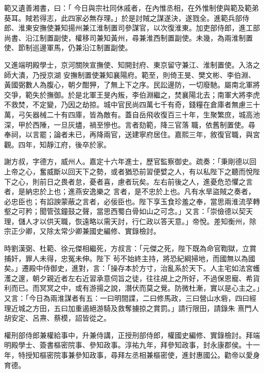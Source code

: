 \begin{pinyinscope}
 範又遺善湘書，曰：「
 今日與宗社同休戚者，在內惟丞相，在外惟制使與範及範弟葵耳。賊若得志，此四家必無存理。」於是討賊之謀遂決，遂戮全。進範兵部侍郎、淮東安撫使兼知揚州兼江淮制置司參謀官，以次復淮東。加吏部侍郎，進工部尚書、沿江制置副使，權移司兼知黃州，尋兼淮西制置副使。未幾，為兩淮制置使、節制巡邊軍馬，仍兼沿江制置副使。



 又進端明殿學士，京河關陜宣撫使、知開封府、東京留守兼江、淮制置使。入洛之師大潰，乃授京湖
 安撫制置使兼知襄陽府。範至，則倚王旻、樊文彬、李伯淵、黃國弼數人為腹心，朝夕酣狎，了無上下之序。民訟邊防，一切廢馳。屬南北軍將交爭，範失於撫御。於是北軍王旻內叛，李伯淵繼之，焚襄陽北去；南軍大將李虎不救焚，不定變，乃因之劫掠。城中官民尚四萬七千有奇，錢糧在倉庫者無慮三十萬，弓矢器械二十有四庫，皆為敵有。蓋自岳飛收復百三十年，生聚繁庶，城高池深，甲於西陲，一旦灰燼，禍至慘也。言者劾範，降三官落
 職，依舊制置使。尋奉祠，以言罷；論者未已，再降兩官，送建寧府居住。嘉熙三年，敘復官職，與宮觀。四年，知靜江府，後卒於家。



 謝方叔，字德方，威州人。嘉定十六年進士，歷官監察御史。疏奏：「秉剛德以回上帝之心，奮威斷以回天下之勢，或者猶恐前習便嬖之人，有以私陛下之聽而悅陛下之心，則前日之畏者怠，憂者喜，慮者玩矣。左右前後之人，進憂危恐懼之言者，是納忠於上也；進燕安逸樂之
 言者，是不忠於上也。凡有水旱盜賊之奏者，必忠臣也；有諂諛蒙蔽之言者，必佞臣也。陛下享玉食珍羞之奉，當思兩淮流莩轉壑之可矜；聞管弦鐘鼓之聲，當思西蜀白骨如山之可念。」又言：「崇儉德以契天理，儲人才以供天職，恢遠略以需天討，行仁政以答天意。」帝悅。差知衡州，除宗正少卿，又除太常少卿兼國史編修、實錄檢討。



 時劉漢弼、杜範、徐元傑相繼死，方叔言：「元傑之死，陛下既為命官鞫獄，立賞捕奸，罪人未得，忠冤未伸。陛下
 茍不始終主持，將恐紀綱掃地，而國無以為國矣。」遷殿中侍御史，進對，言：「操存本於方寸，治亂系於天下。人主宅如法宮蠖濩之邃，朝夕親近者左右近習承意伺旨之徒，往往覘上之所好，不過保恩寵、希貨利而已。而冥冥之中，或有游揚之說，潛伏而莫之覺。防微杜漸，實以是心主之。」又言：「今日為兩淮謀者有五：一曰明間諜，二曰修馬政，三曰營山水砦，四曰經理近城之方田，五曰加重遏絕游騎及救奪擄掠之賞罰。」請行限田，請錄朱
 熹門人胡安定、呂燾、蔡模，詔皆從之。



 權刑部侍郎兼權給事中，升兼侍講，正授刑部侍郎，權國史編修、實錄檢討。拜端明殿學士、簽書樞密院事、參知政事。淳祐九年，拜參知政事，封永康郡侯。十一年，特授知樞密院事兼參知政事，尋拜左丞相兼樞密使，進封惠國公。勸帝以愛身育德。




\end{pinyinscope}
